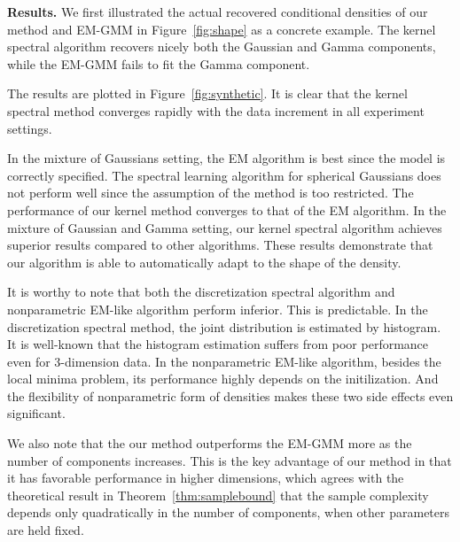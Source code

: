 \documentclass{article}
\begin{document}
{\bf Results.} We first illustrated the actual recovered conditional densities of our method and EM-GMM in Figure~\ref{fig:shape} as a concrete example. The kernel spectral algorithm recovers nicely both the Gaussian and Gamma components, while the EM-GMM fails to fit the Gamma component. 

The results are plotted in Figure~\ref{fig:synthetic}. It is clear that the kernel spectral method converges rapidly with the data increment in all experiment settings.

In the mixture of Gaussians setting, the EM algorithm is best since the model is correctly specified. The spectral learning algorithm for spherical Gaussians does not perform well since the assumption of the method is too restricted. The performance of our kernel method converges to that of the EM algorithm. In the mixture of Gaussian and Gamma setting, our kernel spectral algorithm achieves superior results compared to other algorithms. These results demonstrate that our algorithm is able to automatically adapt to the shape of the density.

It is worthy to note that both the discretization spectral algorithm and nonparametric EM-like algorithm perform inferior. This is predictable. In the discretization spectral method, the joint distribution is estimated by histogram. It is well-known that the histogram estimation suffers from poor performance even for $3$-dimension data. In the nonparametric EM-like algorithm, besides the local minima problem, its performance highly depends on the initilization. And the flexibility of nonparametric form of densities makes these two side effects even significant.

We also note that the our method outperforms the EM-GMM more as the number of components increases.
This is the key advantage of our method in that it has favorable performance in higher dimensions, which agrees with the theoretical result in Theorem~\ref{thm:samplebound} that the sample complexity depends only quadratically in the number of components, when other parameters are held fixed.
\end{document}
